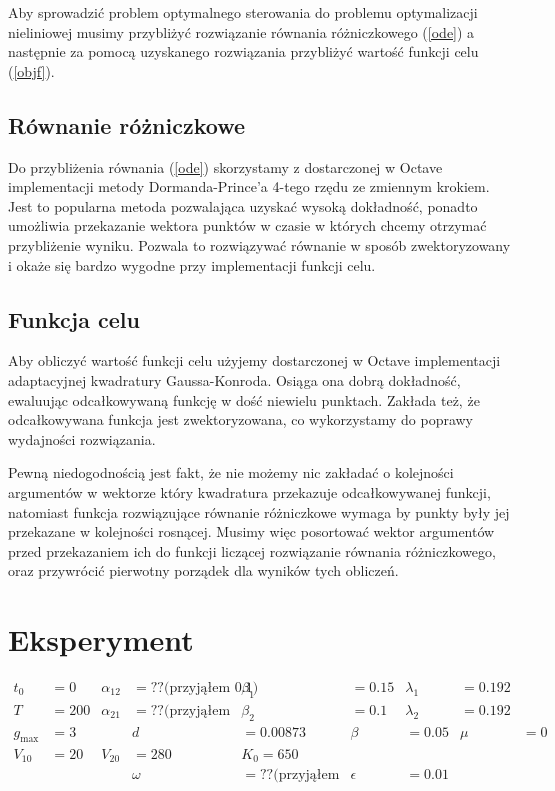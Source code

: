 \documentclass[11pt]{article}
\begin{document}
Aby sprowadzić problem optymalnego sterowania do problemu optymalizacji nieliniowej musimy przybliżyć rozwiązanie równania różniczkowego (\ref{ode}) a następnie za pomocą uzyskanego rozwiązania przybliżyć wartość funkcji celu (\ref{objf}).

\subsection{Równanie różniczkowe}
Do przybliżenia równania (\ref{ode}) skorzystamy z dostarczonej w Octave implementacji metody Dormanda-Prince'a 4-tego rzędu ze zmiennym krokiem. Jest to popularna metoda pozwalająca uzyskać wysoką dokładność, ponadto umożliwia przekazanie wektora punktów w czasie w których chcemy otrzymać przybliżenie wyniku. Pozwala to rozwiązywać równanie w sposób zwektoryzowany i okaże się bardzo wygodne przy implementacji funkcji celu.

\subsection{Funkcja celu}
Aby obliczyć wartość funkcji celu użyjemy dostarczonej w Octave implementacji adaptacyjnej kwadratury Gaussa-Konroda. Osiąga ona dobrą dokładność, ewaluując odcałkowywaną funkcję w dość niewielu punktach. Zakłada też, że odcałkowywana funkcja jest zwektoryzowana, co wykorzystamy do poprawy wydajności rozwiązania.

Pewną niedogodnością jest fakt, że nie możemy nic zakładać o kolejności argumentów w wektorze który kwadratura przekazuje odcałkowywanej funkcji, natomiast funkcja rozwiązujące równanie różniczkowe wymaga by punkty były jej przekazane w kolejności rosnącej. Musimy więc posortować wektor argumentów przed przekazaniem ich do funkcji liczącej rozwiązanie równania różniczkowego, oraz przywrócić pierwotny porządek dla wyników tych obliczeń.

\section{Eksperyment}
\begin{align*}
  t_0 &= 0 & \alpha_{12} &= ?? \text{(przyjąłem 0.1)}  & \beta_1 &= 0.15 & \lambda_1 &= 0.192\\
  T &= 200 & \alpha_{21} &= ?? \text{(przyjąłem 0.15)} & \beta_2 &= 0.1  & \lambda_2 &= 0.192\\
  g_{\max} &= 3 &&     d &= 0.00873                    & \beta &= 0.05  & \mu &= 0 \\
  V_{10} &= 20 &  V_{20} &= 280                        & K_0 = 650 \\
  &&       & \omega &= ?? \text{(przyjąłem 1000)} & \epsilon &= 0.01 \\
\end{align*}

{}

\end{document}
